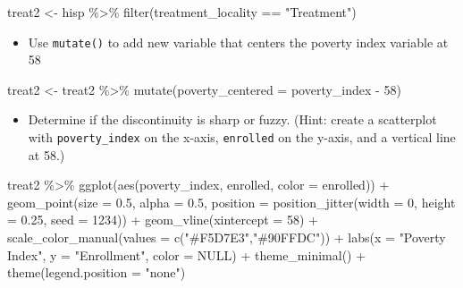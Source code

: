 \documentclass[
  letterpaper,
  DIV=11,
  numbers=noendperiod]{scrartcl}
\newenvironment{Shaded}{\begin{snugshade}}{\end{snugshade}}
\newcommand{\AttributeTok}[1]{\textcolor[rgb]{0.40,0.45,0.13}{#1}}
\newcommand{\ConstantTok}[1]{\textcolor[rgb]{0.56,0.35,0.01}{#1}}
\newcommand{\DecValTok}[1]{\textcolor[rgb]{0.68,0.00,0.00}{#1}}
\newcommand{\FloatTok}[1]{\textcolor[rgb]{0.68,0.00,0.00}{#1}}
\newcommand{\FunctionTok}[1]{\textcolor[rgb]{0.28,0.35,0.67}{#1}}
\newcommand{\NormalTok}[1]{\textcolor[rgb]{0.00,0.23,0.31}{#1}}
\newcommand{\OtherTok}[1]{\textcolor[rgb]{0.00,0.23,0.31}{#1}}
\newcommand{\SpecialCharTok}[1]{\textcolor[rgb]{0.37,0.37,0.37}{#1}}
\newcommand{\StringTok}[1]{\textcolor[rgb]{0.13,0.47,0.30}{#1}}
\providecommand{\tightlist}{%
  \setlength{\itemsep}{0pt}\setlength{\parskip}{0pt}}\usepackage{longtable,booktabs,array}
\begin{document}
\begin{Shaded}
\begin{Highlighting}[numbers=left,,]
\NormalTok{treat2 }\OtherTok{\textless{}{-}}\NormalTok{ hisp }\SpecialCharTok{\%\textgreater{}\%} 
  \FunctionTok{filter}\NormalTok{(treatment\_locality }\SpecialCharTok{==} \StringTok{"Treatment"}\NormalTok{)}
\end{Highlighting}
\end{Shaded}

\begin{itemize}
\tightlist
\item
  Use \texttt{mutate()} to add new variable that centers the poverty
  index variable at 58
\end{itemize}

\begin{Shaded}
\begin{Highlighting}[numbers=left,,]
\NormalTok{treat2 }\OtherTok{\textless{}{-}}\NormalTok{ treat2 }\SpecialCharTok{\%\textgreater{}\%} 
  \FunctionTok{mutate}\NormalTok{(}\AttributeTok{poverty\_centered =}\NormalTok{ poverty\_index }\SpecialCharTok{{-}} \DecValTok{58}\NormalTok{)}
\end{Highlighting}
\end{Shaded}

\begin{itemize}
\tightlist
\item
  Determine if the discontinuity is sharp or fuzzy. (Hint: create a
  scatterplot with \texttt{poverty\_index} on the x-axis,
  \texttt{enrolled} on the y-axis, and a vertical line at 58.)
\end{itemize}

\begin{Shaded}
\begin{Highlighting}[numbers=left,,]
\NormalTok{treat2 }\SpecialCharTok{\%\textgreater{}\%} 
  \FunctionTok{ggplot}\NormalTok{(}\FunctionTok{aes}\NormalTok{(poverty\_index, enrolled, }\AttributeTok{color =}\NormalTok{ enrolled)) }\SpecialCharTok{+}
    \FunctionTok{geom\_point}\NormalTok{(}\AttributeTok{size =} \FloatTok{0.5}\NormalTok{, }\AttributeTok{alpha =} \FloatTok{0.5}\NormalTok{,}
               \AttributeTok{position =} \FunctionTok{position\_jitter}\NormalTok{(}\AttributeTok{width =} \DecValTok{0}\NormalTok{, }\AttributeTok{height =} \FloatTok{0.25}\NormalTok{, }\AttributeTok{seed =} \DecValTok{1234}\NormalTok{)) }\SpecialCharTok{+}
    \FunctionTok{geom\_vline}\NormalTok{(}\AttributeTok{xintercept =} \DecValTok{58}\NormalTok{) }\SpecialCharTok{+}
    \FunctionTok{scale\_color\_manual}\NormalTok{(}\AttributeTok{values =} \FunctionTok{c}\NormalTok{(}\StringTok{"\#F5D7E3"}\NormalTok{,}\StringTok{"\#90FFDC"}\NormalTok{)) }\SpecialCharTok{+}
    \FunctionTok{labs}\NormalTok{(}\AttributeTok{x =} \StringTok{"Poverty Index"}\NormalTok{,}
         \AttributeTok{y =} \StringTok{"Enrollment"}\NormalTok{,}
         \AttributeTok{color =} \ConstantTok{NULL}\NormalTok{) }\SpecialCharTok{+}
    \FunctionTok{theme\_minimal}\NormalTok{() }\SpecialCharTok{+} 
    \FunctionTok{theme}\NormalTok{(}\AttributeTok{legend.position =} \StringTok{"none"}\NormalTok{)}
\end{Highlighting}
\end{Shaded}
\end{document}

